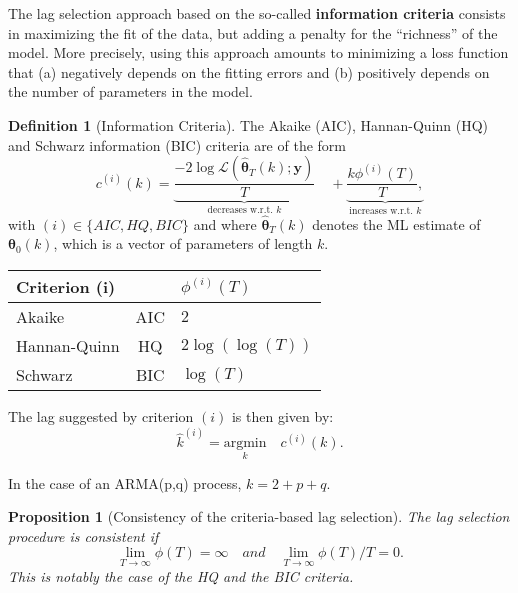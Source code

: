 \documentclass[
  12pt,
]{book}
\newtheorem{proposition}{Proposition}[chapter]
\theoremstyle{definition}
\newtheorem{definition}{Definition}[chapter]
\theoremstyle{definition}
\theoremstyle{definition}
\theoremstyle{definition}
\theoremstyle{remark}
\begin{document}
The lag selection approach based on the so-called \textbf{information criteria} consists in maximizing the fit of the data, but adding a penalty for the ``richness'' of the model. More precisely, using this approach amounts to minimizing a loss function that (a) negatively depends on the fitting errors and (b) positively depends on the number of parameters in the model.

\begin{definition}[Information Criteria]
\protect\hypertarget{def:infocriteria}{}\label{def:infocriteria}The Akaike (AIC), Hannan-Quinn (HQ) and Schwarz information (BIC) criteria are of the form
\[
c^{(i)}(k) = \underbrace{\frac{- 2 \log \mathcal{L}(\hat{\boldsymbol\theta}_T(k);\mathbf{y})}{T}}_{\mbox{decreases w.r.t. $k$}} \quad +
\underbrace{
\frac{k\phi^{(i)}(T)}{T},}_{\mbox{increases w.r.t. $k$}}
\]
with \((i) \in\{AIC,HQ,BIC\}\) and where \(\hat{\boldsymbol\theta}_T(k)\) denotes the ML estimate of \(\boldsymbol\theta_0(k)\), which is a vector of parameters of length \(k\).

\begin{center}
\begin{tabular}{lcl}
\hline
Criterion (i) && $\phi^{(i)}(T)$\\
\hline
Akaike &AIC & $2$ \\
Hannan-Quinn & HQ & $2\log(\log(T))$ \\
Schwarz &BIC & $\log(T)$ \\
\hline
\end{tabular}
\end{center}

The lag suggested by criterion \((i)\) is then given by:
\[
\boxed{\hat{k}^{(i)} = \underset{k}{\mbox{argmin}} \quad c^{(i)}(k).}
\]
\end{definition}

In the case of an ARMA(p,q) process, \(k=2+p+q\).

\begin{proposition}[Consistency of the criteria-based lag selection]
\protect\hypertarget{prp:infocriteria}{}\label{prp:infocriteria}The lag selection procedure is consistent if
\[
\lim_{T \rightarrow \infty} \phi(T) = \infty \quad and \quad \lim_{T \rightarrow \infty} \phi(T)/T = 0.
\]
This is notably the case of the HQ and the BIC criteria.
\end{proposition}
\end{document}
